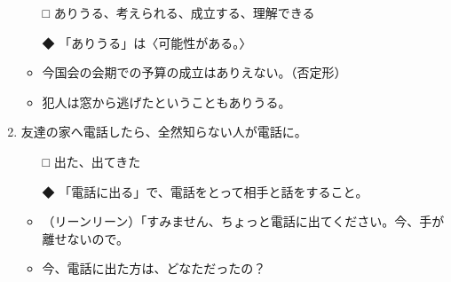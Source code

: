 \documentclass[
uplatex,
b5paper,
10pt,
dvipdfmx
]{jsbook}
\begin{document}
\begin{enumerate}
\begin{itemize}
\item[□] ありうる、考えられる、成立する、理解できる
\item[◆]  「ありうる」は〈可能性がある。〉
\end{itemize}
\begin{itemize}
\item 今国会の会期での予算の成立はありえない。（否定形）
\item 犯人は窓から逃げたということもありうる。
\end{itemize}

\item 友達の家へ電話したら、全然知らない人が電話に\underline{\hspace{3zw}}。
\begin{itemize}
\item[□] 出た、出てきた
\item[◆] 「電話に出る」で、電話をとって相手と話をすること。
\end{itemize}
\begin{itemize}
\item （リーンリーン）「すみません、ちょ{}っと電話に出てください。今、手が
      離せないので。
\item 今、電話に出た方は、どなただったの？
\end{itemize}

\end{enumerate}
\end{document}
